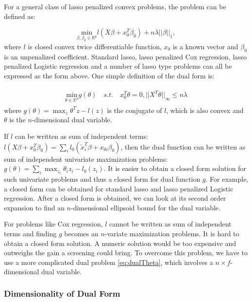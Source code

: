 For a general class of lasso penalized convex problems, the problem can be defined as:

\begin{equation}
    \underset{\beta,\beta_0\in \mathbb{R}^p}{\mathrm{min}}l(X\beta+x_0^T\beta_0)+n\lambda||\beta||_1,
\end{equation}
where $l$ is closed convex twice differentiable function, $x_0$ is a known vector and $\beta_0$ is an unpenalized coefficient. Standard lasso, lasso penalized Cox regression, lasso penalized Logistic regression and a number of lasso type problems can all be expressed as the form above. One simple definition of the dual form is:

\begin{gather}
    \begin{aligned}
         \underset{\theta\in \mathbb{R}^n}{\mathrm{min}} g(\theta)\quad s.t.\quad x_0^T\theta=0,||X^T\theta||_\infty\leq n\lambda
    \end{aligned}
\end{gather}
where $g(\theta)=\max_z \theta^Tz-l(z)$ is the conjugate of $l$, which is also convex and $\theta$ is the $n$-dimensional dual variable.

If $l$ can be written as sum of independent terms: $l(X\beta+x_0^T\beta_0)=\sum_i l_0(\tilde{x}_i^T\beta+x_{0i}\beta_0)$, then the dual function can be written as sum of independent univariate maximization problems: $g(\theta)=\sum_i\max_{z_i} \theta_iz_i-l_0(z_i)$. It is easier to obtain a closed form solution for such univariate problems and thus a closed form for dual function $g$. For example, a closed form can be obtained for standard lasso and lasso penalized Logistic regression. After a closed form is obtained, we can look at its second order expansion to find an $n$-dimensional ellipsoid bound for the dual variable.

For problems like Cox regression, $l$ cannot be written as sum of independent terms and finding $g$ becomes an $n$-variate maximization problems. It is hard to obtain a closed form solution. A numeric solution would be too expensive and outweighs the gain a screening could bring. To overcome this problem, we have to use a more complicated dual problem \eqref{eq:dualTheta}, which involves a $n\times f$-dimensional dual variable. 

\subsubsection{Dimensionality of Dual Form}

